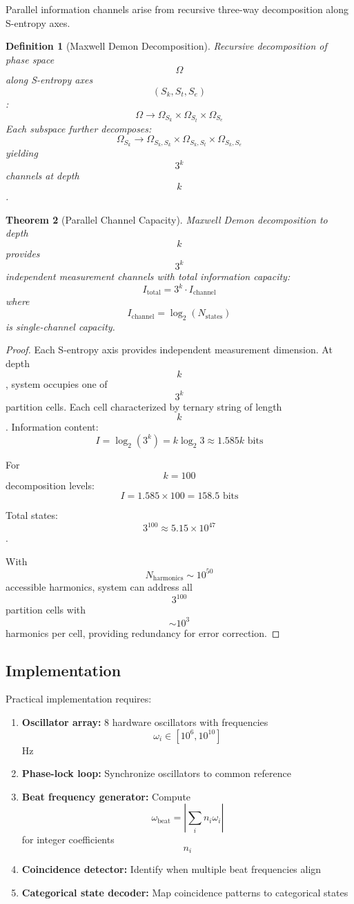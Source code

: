 \documentclass[11pt,twocolumn,a4paper]{article}
\newtheorem{theorem}{Theorem}[section]
\newtheorem{definition}[theorem]{Definition}
\theoremstyle{remark}
\begin{document}
Parallel information channels arise from recursive three-way decomposition along S-entropy axes.

\begin{definition}[Maxwell Demon Decomposition]
\label{def:maxwell_demon}
Recursive decomposition of phase space $$\Omega$$ along S-entropy axes $$(S_k, S_t, S_e)$$:
$$
\Omega \to \Omega_{S_k} \times \Omega_{S_t} \times \Omega_{S_e}
$$
Each subspace further decomposes:
$$
\Omega_{S_k} \to \Omega_{S_k,S_k} \times \Omega_{S_k,S_t} \times \Omega_{S_k,S_e}
$$
yielding $$3^k$$ channels at depth $$k$$.
\end{definition}

\begin{theorem}[Parallel Channel Capacity]
\label{thm:parallel_capacity}
Maxwell Demon decomposition to depth $$k$$ provides $$3^k$$ independent measurement channels with total information capacity:
$$
I_{\mathrm{total}} = 3^k \cdot I_{\mathrm{channel}}
$$
where $$I_{\mathrm{channel}} = \log_2(N_{\mathrm{states}})$$ is single-channel capacity.
\end{theorem}

\begin{proof}
Each S-entropy axis provides independent measurement dimension. At depth $$k$$, system occupies one of $$3^k$$ partition cells. Each cell characterized by ternary string of length $$k$$. Information content:
$$
I = \log_2(3^k) = k \log_2 3 \approx 1.585k \text{ bits}
$$

For $$k = 100$$ decomposition levels:
$$
I = 1.585 \times 100 = 158.5 \text{ bits}
$$

Total states: $$3^{100} \approx 5.15 \times 10^{47}$$.

With $$N_{\mathrm{harmonics}} \sim 10^{50}$$ accessible harmonics, system can address all $$3^{100}$$ partition cells with $$\sim 10^3$$ harmonics per cell, providing redundancy for error correction.
\end{proof}

\subsection{Implementation}

Practical implementation requires:
\begin{enumerate}
\item \textbf{Oscillator array:} 8 hardware oscillators with frequencies $$\omega_i \in [10^6, 10^{10}]$$ Hz
\item \textbf{Phase-lock loop:} Synchronize oscillators to common reference
\item \textbf{Beat frequency generator:} Compute $$\omega_{\mathrm{beat}} = |\sum_i n_i \omega_i|$$ for integer coefficients $$n_i$$
\item \textbf{Coincidence detector:} Identify when multiple beat frequencies align
\item \textbf{Categorical state decoder:} Map coincidence patterns to categorical states
\end{enumerate}
\end{document}
